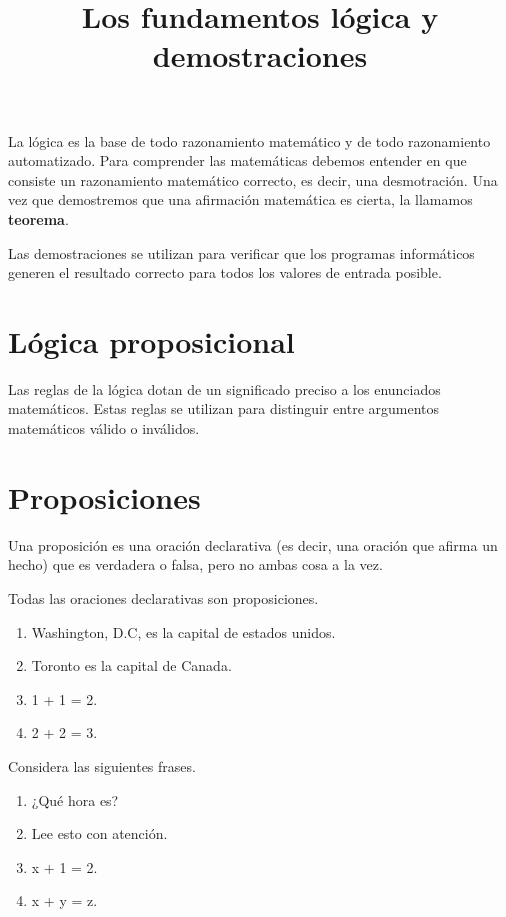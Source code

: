 \documentclass[
  letterpaper,
  DIV=11,
  numbers=noendperiod]{scrartcl}
\title{Los fundamentos lógica y demostraciones}
\author{}
\date{}
\providecommand{\tightlist}{%
  \setlength{\itemsep}{0pt}\setlength{\parskip}{0pt}}
\begin{document}
\maketitle


La lógica es la base de todo razonamiento matemático y de todo
razonamiento automatizado. Para comprender las matemáticas debemos
entender en que consiste un razonamiento matemático correcto, es decir,
una desmotración. Una vez que demostremos que una afirmación matemática
es cierta, la llamamos \textbf{teorema}.

Las demostraciones se utilizan para verificar que los programas
informáticos generen el resultado correcto para todos los valores de
entrada posible.

\section{Lógica proposicional}\label{luxf3gica-proposicional}

Las reglas de la lógica dotan de un significado preciso a los enunciados
matemáticos. Estas reglas se utilizan para distinguir entre argumentos
matemáticos válido o inválidos.

\section{Proposiciones}\label{proposiciones}

Una proposición es una oración declarativa (es decir, una oración que
afirma un hecho) que es verdadera o falsa, pero no ambas cosa a la vez.

Todas las oraciones declarativas son proposiciones.

\begin{enumerate}
\def\labelenumi{\arabic{enumi}.}
\tightlist
\item
  Washington, D.C, es la capital de estados unidos.
\item
  Toronto es la capital de Canada.
\item
  1 + 1 = 2.
\item
  2 + 2 = 3.
\end{enumerate}

Considera las siguientes frases.

\begin{enumerate}
\def\labelenumi{\arabic{enumi}.}
\tightlist
\item
  ¿Qué hora es?
\item
  Lee esto con atención.
\item
  x + 1 = 2.
\item
  x + y = z.
\end{enumerate}
\end{document}
